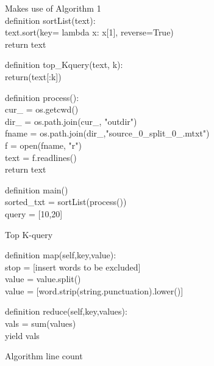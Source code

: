 \documentclass[11pt,journal]{article}
\begin{document}
\begin{algorithm}[H]
\SetAlgoLined
Makes use of Algorithm 1\\

\vspace{10pt}
definition sortList(text):\\
text.sort(key= lambda x: x[1], reverse=True)\\
return text\\
\vspace{10pt}

definition top\_Kquery(text, k):\\
return(text[:k])\\
\vspace{10pt}	

definition process():	\\
cur\_ = os.getcwd()\\
dir\_ = os.path.join(cur_, "outdir")\\
fname = os.path.join(dir\_,"source\_0\_split\_0\_.mtxt")\\
f = open(fname, "r")\\
text = f.readlines()\\
\vspace{5pt}
return text
\vspace{10pt}	

        
definition main()\\
sorted\_txt = sortList(process())\\
query = [10,20]\\
\vspace{5pt}

\caption{ Top K-query}
\end{algorithm}


\begin{algorithm}[H]
\SetAlgoLined

definition map(self,key,value):\\
stop = [insert words to be excluded]\\
value = value.split()\\
value = [word.strip(string.punctuation).lower()]\\
\vspace{5pt}

\vspace{5pt}
definition reduce(self,key,values):\\
vals = sum(values)\\
yield vals


\caption{Algorithm line count}
\end{algorithm}
\end{document}
